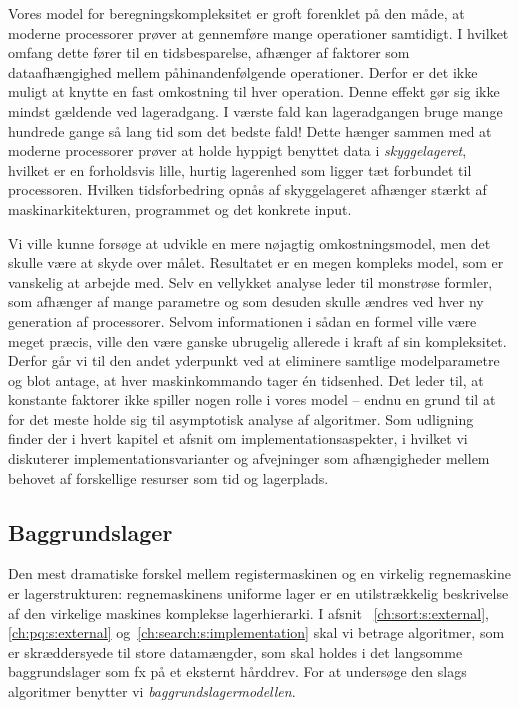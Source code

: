 Vores model for beregningskompleksitet
er groft forenklet på den måde, at moderne processorer prøver at gennemføre mange operationer samtidigt.
I hvilket omfang dette fører til en tidsbesparelse, afhænger af faktorer som dataafhængighed
mellem påhinandenfølgende operationer.
Derfor er det ikke muligt at knytte en fast omkostning til hver operation.
Denne effekt gør sig ikke mindst gældende ved lageradgang.
I værste fald kan lageradgangen bruge mange hundrede gange så lang tid som det bedste fald!
Dette hænger sammen med at moderne processorer prøver at holde hyppigt benyttet data i \emph{skyggelageret},
hvilket er en forholdsvis lille, hurtig lagerenhed som ligger tæt forbundet til processoren.
Hvilken tidsforbedring opnås af skyggelageret afhænger stærkt af maskinarkitekturen, programmet og det konkrete input.

Vi ville kunne forsøge at udvikle en mere nøjagtig omkostningsmodel,
men det skulle være at skyde over målet.
Resultatet er en megen kompleks model, som er vanskelig at arbejde med.
Selv en vellykket analyse leder til monstrøse formler, som afhænger af mange parametre og som desuden skulle ændres ved hver ny generation af processorer.
Selvom informationen i sådan en formel ville være meget præcis, ville den være ganske ubrugelig allerede i kraft af sin kompleksitet.
Derfor går vi til den andet yderpunkt ved at eliminere samtlige modelparametre og blot antage, at hver maskinkommando tager én tidsenhed.
Det leder til, at konstante faktorer ikke spiller nogen rolle i vores model -- endnu en grund til at for det meste holde sig til asymptotisk
analyse af algoritmer.
Som udligning finder der i hvert kapitel et afsnit om implementationsaspekter, i hvilket vi diskuterer implementationsvarianter og afvejninger
som afhængigheder mellem behovet af forskellige resurser som tid og lagerplads.

\subsection{Baggrundslager}
%
Den mest dramatiske forskel mellem registermaskinen og en virkelig regnemaskine er lagerstrukturen:
regnemaskinens uniforme lager er en utilstrækkelig beskrivelse af den virkelige maskines komplekse lagerhierarki.
I afsnit ~\ref{ch:sort:s:external}, \ref{ch:pq:s:external} og~\ref{ch:search:s:implementation} skal vi betrage algoritmer, som er skræddersyede til store datamængder, som skal holdes i det langsomme baggrundslager som fx på et eksternt hårddrev.
For at undersøge den slags algoritmer benytter vi \emph{baggrundslagermodellen}.

